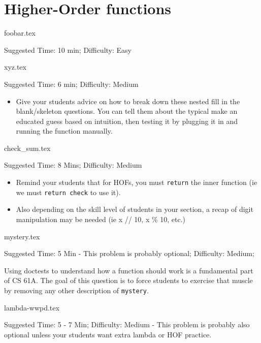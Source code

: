 \documentclass{exam}
\begin{document}
\section{Higher-Order functions}
\begin{questions}
    {foobar.tex}
    \begin{questionmeta}
        Suggested Time: 10 min; Difficulty: Easy
    \end{questionmeta}

    {xyz.tex}
    \begin{questionmeta}
        Suggested Time: 6 min; Difficulty: Medium
        \begin{itemize}
            \item Give your students advice on how to break down these nested fill in the blank/skeleton questions.
            \subitem You can tell them about the typical make an educated guess based on intuition, then testing it by plugging it in and running the function manually.
        \end{itemize}
    \end{questionmeta}

    {check_sum.tex}
    \begin{questionmeta}
        Suggested Time: 8 Mins; Difficulty: Medium
        \begin{itemize}
            \item Remind your students that for HOFs, you must \lstinline{return} the inner function (ie we must \lstinline{return check} to use it).
            \item Also depending on the skill level of students in your section, a recap of digit manipulation may be needed (ie x // 10, x \% 10, etc.)
        \end{itemize}
    \end{questionmeta}

    {mystery.tex}
    \begin{questionmeta}
        Suggested Time: 5 Min - This problem is probably optional; Difficulty: Medium;

        Using doctests to understand how a function should work is a fundamental part of CS 61A. The goal of this question is to force students to exercise that muscle by removing any other description of \lstinline{mystery}.
    \end{questionmeta}

    {lambda-wwpd.tex}
    \begin{questionmeta}
        Suggested Time: 5 - 7 Min; Difficulty: Medium - This problem is probably also optional unless your students want extra lambda or HOF practice.
    \end{questionmeta}

\end{questions}
\end{document}
